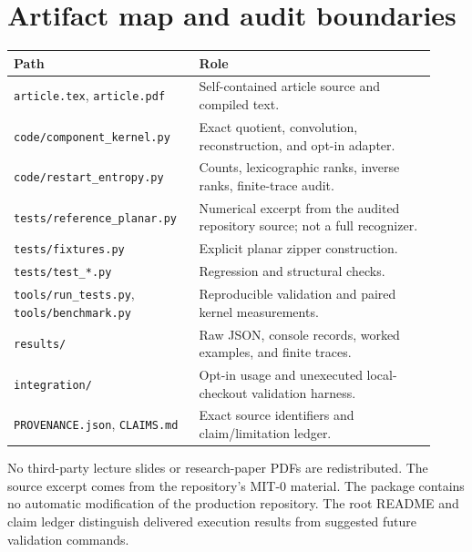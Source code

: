 \documentclass[11pt,letterpaper]{article}
\theoremstyle{definition}
\theoremstyle{remark}
\begin{document}
\appendix
\section{Artifact map and audit boundaries}
\begin{center}
\small
\begin{tabular}{p{0.39\linewidth}p{0.53\linewidth}}
\toprule
Path & Role\\
\midrule
\texttt{article.tex}, \texttt{article.pdf} & Self-contained article source and compiled text.\\
\texttt{code/component\_kernel.py} & Exact quotient, convolution, reconstruction, and opt-in adapter.\\
\texttt{code/restart\_entropy.py} & Counts, lexicographic ranks, inverse ranks, finite-trace audit.\\
\texttt{tests/reference\_planar.py} & Numerical excerpt from the audited repository source; not a full recognizer.\\
\texttt{tests/fixtures.py} & Explicit planar zipper construction.\\
\texttt{tests/test\_*.py} & Regression and structural checks.\\
\texttt{tools/run\_tests.py}, \texttt{tools/benchmark.py} & Reproducible validation and paired kernel measurements.\\
\texttt{results/} & Raw JSON, console records, worked examples, and finite traces.\\
\texttt{integration/} & Opt-in usage and unexecuted local-checkout validation harness.\\
\texttt{PROVENANCE.json}, \texttt{CLAIMS.md} & Exact source identifiers and claim/limitation ledger.\\
\bottomrule
\end{tabular}
\end{center}

No third-party lecture slides or research-paper PDFs are redistributed.
The source excerpt comes from the repository's MIT-0 material. The package
contains no automatic modification of the production repository.
The root README and claim ledger distinguish delivered execution results
from suggested future validation commands.
\end{document}

